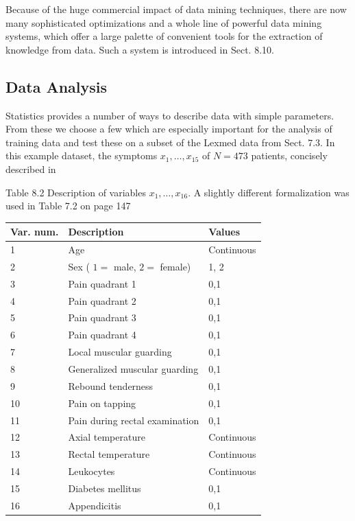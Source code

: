\documentclass[10pt]{book}
\begin{document}
Because of the huge commercial impact of data mining techniques, there are now many sophisticated optimizations and a whole line of powerful data mining systems, which offer a large palette of convenient tools for the extraction of knowledge from data. Such a system is introduced in Sect. 8.10.

\subsection{Data Analysis}
Statistics provides a number of ways to describe data with simple parameters. From these we choose a few which are especially important for the analysis of training data and test these on a subset of the Lexmed data from Sect. 7.3. In this example dataset, the symptoms $x_{1}, \ldots, x_{15}$ of $N=473$ patients, concisely described in

Table 8.2 Description of variables $x_{1}, \ldots, x_{16}$. A slightly different formalization was used in Table 7.2 on page 147
\begin{center}
\begin{tabular}{|l|l|l|}
\hline
Var. num. & Description & Values \\
\hline
1 & Age & Continuous \\
\hline
2 & Sex ( $1=$ male, $2=$ female) & 1, 2 \\
\hline
3 & Pain quadrant 1 & 0,1 \\
\hline
4 & Pain quadrant 2 & 0,1 \\
\hline
5 & Pain quadrant 3 & 0,1 \\
\hline
6 & Pain quadrant 4 & 0,1 \\
\hline
7 & Local muscular guarding & 0,1 \\
\hline
8 & Generalized muscular guarding & 0,1 \\
\hline
9 & Rebound tenderness & 0,1 \\
\hline
10 & Pain on tapping & 0,1 \\
\hline
11 & Pain during rectal examination & 0,1 \\
\hline
12 & Axial temperature & Continuous \\
\hline
13 & Rectal temperature & Continuous \\
\hline
14 & Leukocytes & Continuous \\
\hline
15 & Diabetes mellitus & 0,1 \\
\hline
16 & Appendicitis & 0,1 \\
\hline
\end{tabular}
\end{center}
\hline
\end{document}
